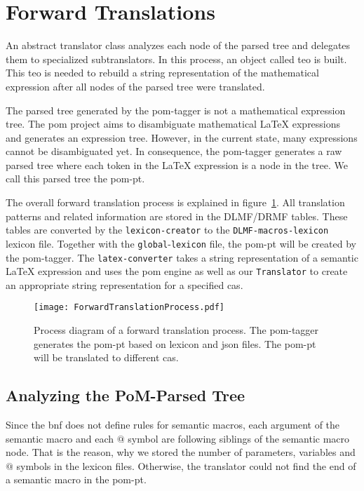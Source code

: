 \section{Forward Translations}\label{sec:forward-translation}
An abstract translator class analyzes each node of the parsed tree and delegates them to specialized subtranslators. In this process, an object called \gls*{teo} is built. This \gls*{teo} is needed to rebuild a string representation of the mathematical expression after all nodes of the parsed tree were translated.

The parsed tree generated by the \gls*{pom}-tagger is not a mathematical expression tree. The \gls*{pom} project aims to disambiguate mathematical \LaTeX{} expressions and generates an expression tree. However, in the current state, many expressions cannot be disambiguated yet. In consequence, the \gls*{pom}-tagger generates a raw parsed tree where each token in the \LaTeX{} expression is a node in the tree. We call this parsed tree the \gls*{pom-pt}.

{\sloppy The overall forward translation process is explained in figure~\ref{fig:forward-trans}. All translation patterns and related information are stored in the DLMF/DRMF tables. These tables are converted by the \verb|lexicon-creator| to the \verb|DLMF-macros-lexicon| lexicon file. Together with the \verb|global|-\verb|lexicon| file, the \gls*{pom-pt} will be created by the \gls*{pom}-tagger. The \verb|latex-converter| takes a string representation of a semantic \LaTeX{} expression and uses the \gls*{pom} engine as well as our \verb|Translator| to create an appropriate string representation for a specified \gls*{cas}.}

\begin{figure}[ht]
	\vspace{-10pt}
	\centering
	\texttt{[image: ForwardTranslationProcess.pdf]}
	\caption{Process diagram of a forward translation process. The \gls*{pom}-tagger generates the \gls*{pom-pt} based on lexicon and \gls*{json} files. The \gls*{pom-pt} will be translated to different \gls*{cas}.}
	\label{fig:forward-trans}
	\vspace{-10pt}
\end{figure}

\subsection{Analyzing the PoM-Parsed Tree}\label{subsec:analyze-mlp}
Since the \gls*{bnf} does not define rules for semantic macros, each argument of the semantic macro and each $@$ symbol are following siblings of the semantic macro node. That is the reason, why we stored the number of parameters, variables and $@$ symbols in the lexicon files. Otherwise, the translator could not find the end of a semantic macro in the \gls*{pom-pt}.

